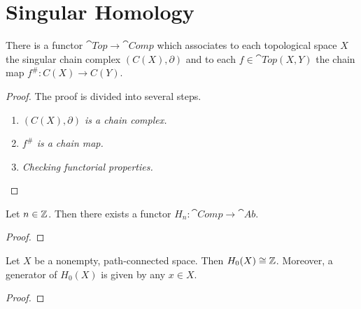\section{Singular Homology}

\begin{proposition}
	There is a functor $\cat{Top} \to \cat{Comp}$ which associates to each topological space $X$ the singular chain complex $(C(X),\partial)$ and to each $f \in \cat{Top}(X,Y)$ the chain map $f^\# : C(X) \to C (Y)$. 
\end{proposition}

\begin{proof}
	The proof is divided into several steps.
	\begin{enumerate}[label = \emph{Step \arabic*:}]
		\item \emph{$(C(X),\partial)$ is a chain complex.}
		\item \emph{$f^\#$ is a chain map.}
		\item \emph{Checking functorial properties.}
	\end{enumerate}
\end{proof}

\begin{proposition}
	Let $n \in \mathbb{Z}$. Then there exists a functor $H_n : \cat{Comp} \to \cat{Ab}$.
\end{proposition}

\begin{proof}
	
\end{proof}

\begin{proposition}
	Let $X$ be a nonempty, path-connected space. Then $H_0(X) \cong \mathbb{Z}$. Moreover, a generator of $H_0(X)$ is given by any $x \in X$.
\end{proposition}

\begin{proof}
	
\end{proof}
